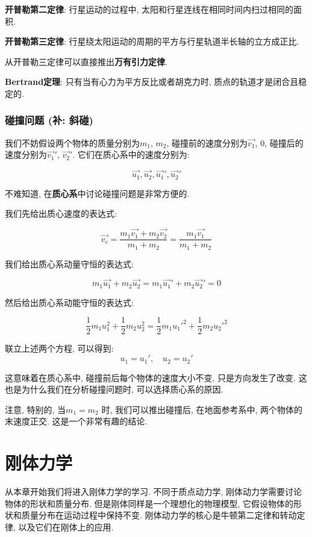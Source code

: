 \documentclass[
  a4paper,
]{ctexrep}
\begin{document}
\textbf{开普勒第二定律}: 行星运动的过程中,
太阳和行星连线在相同时间内扫过相同的面积.

\textbf{开普勒第三定律}:
行星绕太阳运动的周期的平方与行星轨道半长轴的立方成正比.

从开普勒三定律可以直接推出\textbf{万有引力定律}.

\textbf{Bertrand定理}: 只有当有心力为平方反比或者胡克力时,
质点的轨道才是闭合且稳定的.

\subsection{碰撞问题 (补:
斜碰)}\label{ux78b0ux649eux95eeux9898-ux8865-ux659cux78b0}

我们不妨假设两个物体的质量分别为\(m_1\), \(m_2\),
碰撞前的速度分别为\(\vec{v_1}\), \(0\),
碰撞后的速度分别为\(\vec{v_1}'\), \(\vec{v_2}'\).
它们在质心系中的速度分别为:

\[\vec{u_1}, \vec{u_2}, \vec{u_1}' , \vec{u_2}'\]

不难知道, 在\textbf{质心系}中讨论碰撞问题是非常方便的.

我们先给出质心速度的表达式:

\[
\vec{v_c} = \frac{m_1 \vec{v_1} + m_2 \vec{v_2}}{m_1 + m_2} = \frac{m_1 \vec{v_1}}{m_1 + m_2}
\]

我们给出质心系动量守恒的表达式:

\[m_1 \vec{u_1} + m_2 \vec{u_2} = m_1 \vec{u_1}' + m_2 \vec{u_2}' = 0\]

然后给出质心系动能守恒的表达式:

\[\frac{1}{2} m_1 u_1^2 + \frac{1}{2} m_2 u_2^2 = \frac{1}{2} m_1 u_1'^2 + \frac{1}{2} m_2 u_2'^2\]

联立上述两个方程, 可以得到: \[u_1 = u_1', \quad u_2 = u_2'\]

这意味着在质心系中, 碰撞前后每个物体的速度大小不变, 只是方向发生了改变.
这也是为什么我们在分析碰撞问题时, 可以选择质心系的原因.

注意, 特别的, 当\(m_1 = m_2\) 时, 我们可以推出碰撞后, 在地面参考系中,
两个物体的末速度正交. 这是一个非常有趣的结论.

\chapter{刚体力学}\label{ux521aux4f53ux529bux5b66}

从本章开始我们将进入刚体力学的学习. 不同于质点动力学,
刚体动力学需要讨论物体的形状和质量分布.
但是刚体同样是一个理想化的物理模型,
它假设物体的形状和质量分布在运动过程中保持不变.
刚体动力学的核心是牛顿第二定律和转动定律, 以及它们在刚体上的应用.
\end{document}
